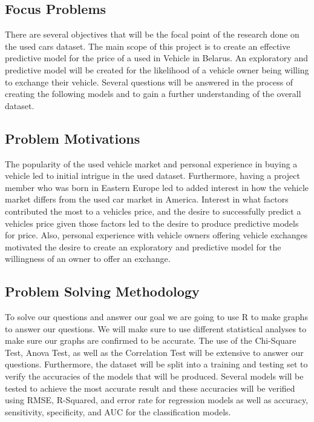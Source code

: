 \documentclass[
]{article}
\begin{document}
\hypertarget{focus-problems}{%
\subsection{Focus Problems}\label{focus-problems}}

There are several objectives that will be the focal point of the
research done on the used cars dataset. The main scope of this project
is to create an effective predictive model for the price of a used in
Vehicle in Belarus. An exploratory and predictive model will be created
for the likelihood of a vehicle owner being willing to exchange their
vehicle. Several questions will be answered in the process of creating
the following models and to gain a further understanding of the overall
dataset.

\hypertarget{problem-motivations}{%
\subsection{Problem Motivations}\label{problem-motivations}}

The popularity of the used vehicle market and personal experience in
buying a vehicle led to initial intrigue in the used dataset.
Furthermore, having a project member who was born in Eastern Europe led
to added interest in how the vehicle market differs from the used car
market in America. Interest in what factors contributed the most to a
vehicles price, and the desire to successfully predict a vehicles price
given those factors led to the desire to produce predictive models for
price. Also, personal experience with vehicle owners offering vehicle
exchanges motivated the desire to create an exploratory and predictive
model for the willingness of an owner to offer an exchange.

\hypertarget{problem-solving-methodology}{%
\subsection{Problem Solving
Methodology}\label{problem-solving-methodology}}

To solve our questions and answer our goal we are going to use R to make
graphs to answer our questions. We will make sure to use different
statistical analyses to make sure our graphs are confirmed to be
accurate. The use of the Chi-Square Test, Anova Test, as well as the
Correlation Test will be extensive to answer our questions. Furthermore,
the dataset will be split into a training and testing set to verify the
accuracies of the models that will be produced. Several models will be
tested to achieve the most accurate result and these accuracies will be
verified using RMSE, R-Squared, and error rate for regression models as
well as accuracy, sensitivity, specificity, and AUC for the
classification models.
\end{document}
